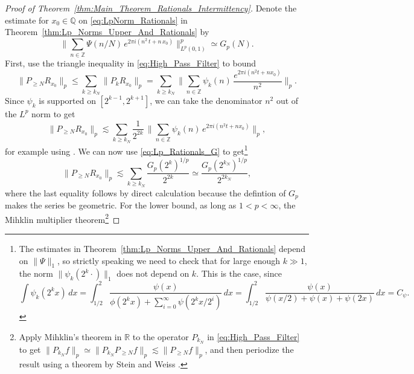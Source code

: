 \documentclass[11pt,reqno]{amsart}
\theoremstyle{definition}
\begin{document}
\begin{proof}[Proof of Theorem~\ref{thm:Main_Theorem_Rationals_Intermittency}]
Denote the estimate for $x_0 \in \mathbb Q$ 
on \eqref{eq:LpNorm_Rationals} 
in Theorem~\ref{thm:Lp_Norms_Upper_And_Rationals}
by
\begin{equation}\label{eq:Lp_Rationals_G}
\big\lVert  \sum_{n \in \mathbb Z} \Psi(n/N)\,  e^{2\pi i (n^2 \, t + n \, x_0)}  \big\rVert_{L^p(0,1)}^p
\simeq G_p(N).
\end{equation}
First, use the triangle inequality in \eqref{eq:High_Pass_Filter} to bound
\begin{equation}
\lVert P_{\geq N} R_{x_0} \rVert_p
\leq 
\sum_{k \geq k_N} \lVert P_k R_{x_0} \rVert_p
= \sum_{k \geq k_N} \Big\lVert \sum_{n \in \mathbb Z} \psi_k(n) \, \frac{e^{2\pi i (n^2 t + nx_0)}}{n^2} \Big\rVert_p.
\end{equation}
Since $\psi_k$ is supported on $[2^{k-1}, 2^{k+1}]$, 
we can take the denominator $n^2$ out of the $L^p$ norm to get
\begin{equation}
\lVert P_{\geq N} R_{x_0} \rVert_p
\lesssim 
\sum_{k \geq k_N} \frac{1}{2^{2k}} \, \Big\lVert \sum_{n \in \mathbb Z} \psi_k(n) \, e^{2\pi i (n^2 t + nx_0)} \Big\rVert_p,
\end{equation}
for example using \cite[Lemma 3.1, Corollary 3.2]{EceizabarrenaVilacaDaRocha2022}. 
We can now use \eqref{eq:Lp_Rationals_G} 
to get\footnote{The estimates in Theorem~\ref{thm:Lp_Norms_Upper_And_Rationals} depend on $\lVert \Psi \rVert_1$, so strictly speaking we need to check that for large enough $k \gg 1$, the norm $\lVert \psi_k(2^k \cdot) \rVert_1$ does not depend on $k$. This is the case, since 
\begin{equation}
\int \psi_k(2^k x) \, dx = \int_{1/2}^2 \frac{\psi(x)}{\phi(2^k x) + \sum_{i=0}^\infty \psi(2^k x /2^i)} \, dx
= \int_{1/2}^2 \frac{\psi(x)}{\psi(x/2) + \psi(x) + \psi(2x) }\, dx 
= C_\psi. 
\end{equation}  
}
\begin{equation}\label{eq:Proof_UpperBound}
\lVert P_{\geq N} R_{x_0} \rVert_p
\lesssim 
\sum_{k \geq k_N} \frac{G_p(2^k)^{1/p}}{2^{2k}} 
\simeq \frac{G_p(2^{k_N})^{1/p}}{2^{2k_N}},
\end{equation} 
where the last equality follows by direct calculation because 
the defintion of $G_p$ makes the series be geometric. 
For the lower bound, as long as $ 1 < p < \infty$, 
the Mihklin multiplier theorem\footnote{Apply Mihklin's theorem in $\mathbb R$ to the operator $P_{k_N}$ in \eqref{eq:High_Pass_Filter} to get $\lVert P_{k_N} f \rVert_p \simeq \lVert P_{k_N} P_{\geq N} f \rVert_p \lesssim \lVert P_{\geq N} f \rVert_p$, and then periodize the result using a theorem by Stein and Weiss \cite [Chapter 7, Theorem 3.8]{SteinWeiss1971}.  }

\end{proof}
\end{document}
